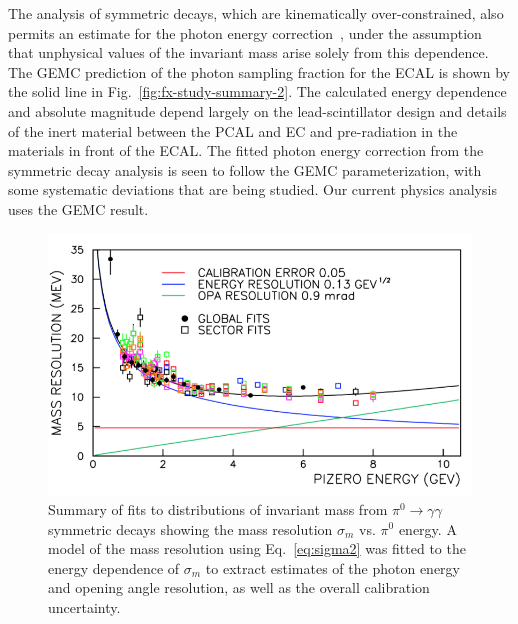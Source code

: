 The analysis of symmetric decays, which are kinematically over-constrained, also permits an estimate for the photon
energy correction~\cite{2006015}, under the assumption that unphysical values of the invariant mass arise solely
from this dependence. The GEMC prediction of the photon sampling fraction for the ECAL is shown by the solid line
in Fig.~\ref{fig:fx-study-summary-2}. The calculated energy dependence and absolute magnitude depend largely on
the lead-scintillator design and details of the inert material between the PCAL and EC and pre-radiation in the
materials in front of the ECAL. The fitted photon energy correction from the symmetric decay analysis is seen to
follow the GEMC parameterization, with some systematic deviations that are being studied. Our current physics
analysis uses the GEMC result.

\begin{figure}[h]
\centering
\includegraphics[width=1.0\columnwidth,keepaspectratio]{img/fx-study-summary.png}
\caption[]{Summary of fits to distributions of invariant mass from $\pi^0 \rightarrow \gamma \gamma$ symmetric
  decays showing the mass resolution $\sigma_m$ vs. $\pi^0$ energy. A model of the mass resolution using
  Eq.~\ref{eq:sigma2} was fitted to the energy dependence of $\sigma_m$ to extract estimates of the photon
  energy and opening angle resolution, as well as the overall calibration uncertainty.}
\label{fig:fx-study-summary}
\end{figure}

